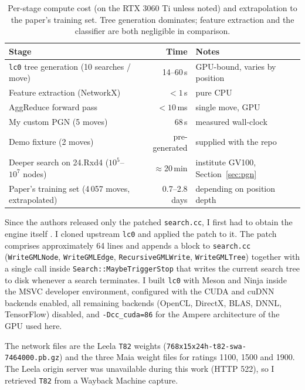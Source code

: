\documentclass[11pt,a4paper]{article}
\begin{document}
\begin{table}[h]
  \centering\small
  \caption{Per-stage compute cost (on the RTX 3060 Ti unless noted)
    and extrapolation to the paper's training set. Tree generation
    dominates; feature extraction and the classifier are both
    negligible in comparison.}
  \label{tab:compute}
  \begin{tabular}{@{}lrl@{}}
    \toprule
    \textbf{Stage} & \textbf{Time} & \textbf{Notes} \\
    \midrule
    \texttt{lc0} tree generation (10 searches / move) & 14--60\,s    & GPU-bound, varies by position \\
    Feature extraction (NetworkX)                      & $<1$\,s      & pure CPU \\
    AggReduce forward pass                             & $<10$\,ms    & single move, GPU \\
    \midrule
    My custom PGN (5 moves)                            & 68\,s        & measured wall-clock \\
    Demo fixture (2 moves)                             & pre-generated & supplied with the repo \\
    Deeper search on 24.Rxd4 ($10^5$--$10^7$ nodes)    & $\approx$20\,min & institute GV100, Section~\ref{sec:pgn} \\
    Paper's training set (4\,057 moves, extrapolated)  & 0.7--2.8 days & depending on position depth \\
    \bottomrule
  \end{tabular}
\end{table}

Since the authors released only the patched \texttt{search.cc}, I first
had to obtain the engine itself \citep{lc0repo}. I cloned upstream
\texttt{lc0} and applied the patch to it. The patch comprises
approximately 64 lines and appends a block to \texttt{search.cc}
(\texttt{WriteGMLNode}, \texttt{WriteGMLEdge},
\texttt{RecursiveGMLWrite}, \texttt{WriteGMLTree}) together with a
single call inside \texttt{Search::MaybeTriggerStop} that writes the
current search tree to disk whenever a search terminates. I built
\texttt{lc0} with Meson and Ninja inside the MSVC developer
environment, configured with the CUDA and cuDNN backends enabled, all
remaining backends (OpenCL, DirectX, BLAS, DNNL, TensorFlow) disabled,
and \texttt{-Dcc\_cuda=86} for the Ampere architecture of the GPU used
here.

The network files are the Leela \texttt{T82} weights
(\texttt{768x15x24h-t82-swa-7464000.pb.gz}) and the three Maia weight
files for ratings 1100, 1500 and 1900. The Leela origin server was
unavailable during this work (HTTP 522), so I retrieved \texttt{T82}
from a Wayback Machine capture.
\end{document}
